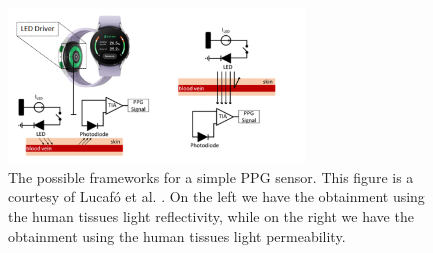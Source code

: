 \begin{figure}
	\centering
	\includegraphics[width=0.7\textwidth]{img/ppg.png}
	\caption{The possible frameworks for a simple \gls{PPG} sensor. This figure is a courtesy of Lucafó et al. \protect\cite{deep-learning-3}. 
	On the left we have the obtainment using the human tissues light reflectivity, while on the right we have the obtainment using the human tissues light permeability.}
	\label{fig:method:ppg}
\end{figure}
